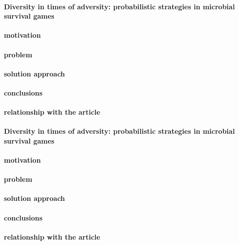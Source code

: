 \documentclass{article}
\begin{document}
\paragraph{Diversity in times of adversity: probabilistic strategies in microbial survival games\cite{denise_m._wolf_diversity_2005}}

\paragraph{motivation}
\paragraph{problem}
\paragraph{solution approach}
\paragraph{conclusions}
\paragraph{relationship with the article}

\paragraph{Diversity in times of adversity: probabilistic strategies in microbial survival games\cite{denise_m._wolf_diversity_2005}}

\paragraph{motivation}
\paragraph{problem}
\paragraph{solution approach}
\paragraph{conclusions}
\paragraph{relationship with the article}
\end{document}
